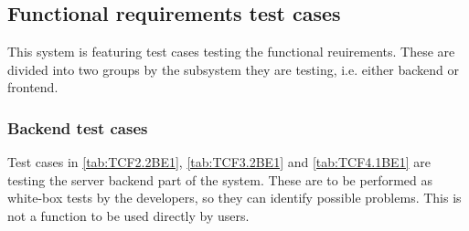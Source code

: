 \documentclass[11pt]{book}
\begin{document}
\subsection{Functional requirements test cases}

This system is featuring test cases testing the functional reuirements. These are divided into two groups by the subsystem they are testing, i.e. either backend or frontend.

\subsubsection{Backend test cases}

Test cases in \ref{tab:TCF2.2BE1}, \ref{tab:TCF3.2BE1} and \ref{tab:TCF4.1BE1} are testing the server backend part of the system. These are to be performed as white-box tests by the developers, so they can identify possible problems. This is not a function to be used directly by users.
\end{document}
